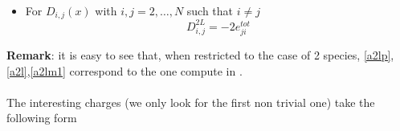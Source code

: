 \documentclass[10pt]{article}
\numberwithin{equation}{section}
\numberwithin{equation}{subsection}
\begin{document}
\begin{itemize}

\item For $D_{i,j}(x)$ with $i,j=2,\ldots,N$ such that $i\neq j$
\begin{equation}\label{Dij-Charge}
D_{i,j}^{2L}=-2e_{ji}^{tot}
\end{equation}
\end{itemize}
\textbf{Remark}: it is easy to see that, when restricted to the case of 2 species,  \eqref{a2lp},\eqref{a2l},\eqref{a2lm1} correspond to the one compute in \cite{frassek2020eigenstates}. \\ \\
The interesting charges (we only look for the first non trivial one) take the following form  
\end{document}
